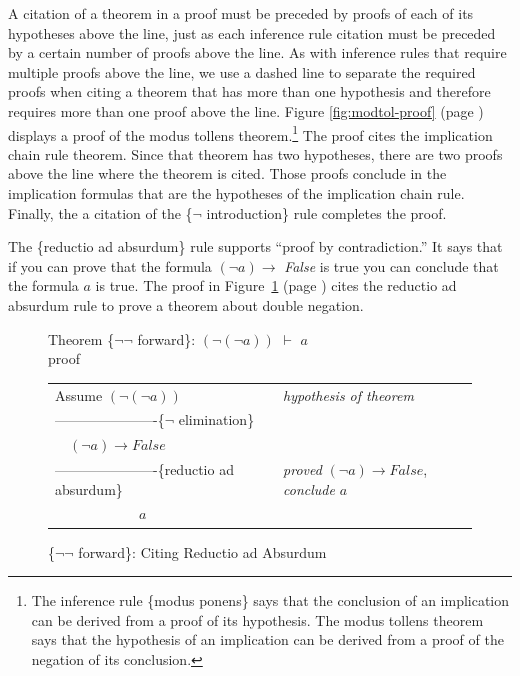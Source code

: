 {A citation of a theorem in a proof must be preceded by proofs of
each of its hypotheses above the line, just as
each inference rule citation must be preceded by a certain number of proofs above the line.
As with inference rules that require multiple proofs above the line,
we use a dashed line to separate the required proofs
when citing a theorem that has more than one hypothesis and therefore
requires more than one proof above the line.
Figure \ref{fig:modtol-proof} (page \pageref{fig:modtol-proof})
displays a proof of the modus tollens theorem.\footnote{The
inference rule \{modus ponens\} says that the conclusion of an implication
can be derived from a proof of its hypothesis.
The modus tollens theorem says that the hypothesis
of an implication can be derived from
a proof of the negation of its conclusion.}
The proof cites the implication chain rule theorem.
Since that theorem has two hypotheses, there are two proofs above
the line where the theorem is cited. Those proofs conclude in
the implication formulas that are the hypotheses of the implication chain rule.
Finally, the a citation of the \{$\neg$ introduction\} rule completes the proof.

The \{reductio ad absurdum\} rule supports
``proof by contradiction.''
It says that if you can prove that the formula
$(\neg a) \rightarrow$ \emph{False} is true
you can conclude that the formula $a$ is true.
The proof in Figure~\ref{fig:dbl-neg-fwd} (page \pageref{fig:dbl-neg-fwd})
cites the
reductio
ad absurdum rule to prove a theorem about double negation.

\begin{figure}
Theorem \{$\neg \neg$ forward\}: $(\neg(\neg a))$ $\vdash$ $a$\\
proof
\begin{center}
\begin{tabular}{ll}
Assume $(\neg(\neg a))$                       &\emph{hypothesis of theorem}\\
----------------------\{$\neg$ elimination\}  &\\
~~$(\neg a) \rightarrow False$                &\\
----------------------\{reductio ad absurdum\}&\emph{proved} $(\neg a) \rightarrow False$, \emph{conclude} $a$\\
~~~~~~~~~~~~$a$                               &\\
\end{tabular}
\end{center}
\caption{\{$\neg \neg$ forward\}: Citing Reductio ad Absurdum}
\label{fig:dbl-neg-fwd}
\end{figure}

}
